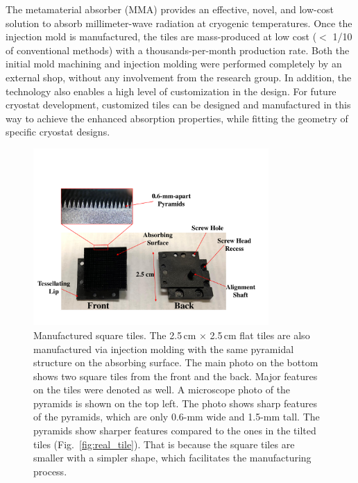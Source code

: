 The metamaterial absorber (MMA) provides an effective, novel, and low-cost solution to absorb millimeter-wave radiation at cryogenic temperatures. Once the injection mold is manufactured, the tiles are mass-produced at low cost ($<$ 1/10 of conventional methods) with a thousands-per-month production rate. Both the initial mold machining and injection molding were performed completely by an external shop, without any involvement from the research group. In addition, the technology also enables a high level of customization in the design. For future cryostat development, customized tiles can be designed and manufactured in this way to achieve the enhanced absorption properties, while fitting the geometry of specific cryostat designs.

\begin{figure}[ht]
    \centering
    \includegraphics[width=0.8\textwidth]{Figures/square_tiles.pdf}
    \caption{Manufactured square tiles. The 2.5\,cm $\times$ 2.5\,cm flat tiles are also manufactured via injection molding with the same pyramidal structure on the absorbing surface. The main photo on the bottom shows two square tiles from the front and the back. Major features on the tiles were denoted as well. A microscope photo of the pyramids is shown on the top left. The photo shows sharp features of the pyramids, which are only 0.6-mm wide and 1.5-mm tall. The pyramids show sharper features compared to the ones in the tilted tiles (Fig.~\ref{fig:real_tile}). That is because the square tiles are smaller with a simpler shape, which facilitates the manufacturing process.}
    \label{fig:square_tiles}
\end{figure}

